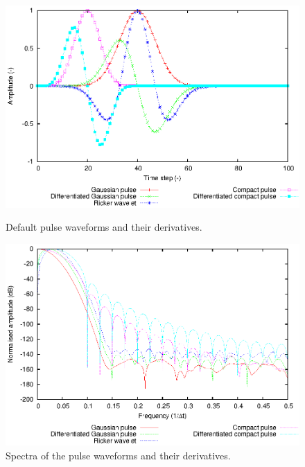 \documentclass[onecolumn,a4paper]{article}
\numberwithin{equation}{section}
\begin{document}
\begin{figure}[p]
  \begin{center}
    \includegraphics[width=0.9\linewidth]{figures/waveforms_td}
  \end{center}
  \caption{\label{fg:wfpulsetd}Default pulse waveforms and their derivatives.}
  \begin{center}
    \includegraphics[width=0.9\linewidth]{figures/waveforms_fd}
  \end{center}
  \caption{\label{fg:wfpulsefd}Spectra of the pulse waveforms and their derivatives.}
\end{figure}
\end{document}
